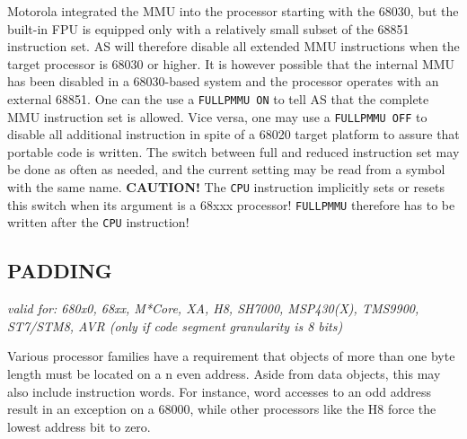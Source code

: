 \documentclass[12pt,twoside]{report}
\makeatletter
\newcommand{\bb}[1]{{\bf #1}}
\newcommand{\tty}[1]{{\tt #1}}
\newcommand{\ttindex}[1]{\index{#1@{\tt #1}}}
\makeatother
\begin{document}
Motorola integrated the MMU into the processor starting with the 68030, but
the built-in FPU is equipped only with a relatively small subset of the
68851 instruction set.  AS will therefore disable all extended MMU
instructions when the target processor is 68030 or higher.  It is however
possible that the internal MMU has been disabled in a 68030-based system
and the processor operates with an external 68851.  One can the use a
\tty{FULLPMMU ON} to tell AS that the complete MMU instruction set is
allowed.  Vice versa, one may use a \tty{FULLPMMU OFF} to disable all
additional instruction in spite of a 68020 target platform to assure that
portable code is written.  The switch between full and reduced instruction
set may be done as often as needed, and the current setting may be read
from a symbol with the same name.  \bb{CAUTION!} The \tty{CPU} instruction
implicitly sets or resets this switch when its argument is a 68xxx
processor!  \tty{FULLPMMU} therefore has to be written after the \tty{CPU}
instruction!


\subsection{PADDING}
\ttindex{PADDING}

{\em valid for: 680x0, 68xx, M*Core, XA, H8, SH7000, MSP430(X), TMS9900,\\
      ST7/STM8, AVR (only if code segment granularity is 8 bits)}

Various processor families have a requirement that objects of more than
one byte length must be located on a n even address.  Aside from data
objects, this may also include instruction words.  For instance, word
accesses to an odd address result in an exception on a 68000, while other
processors like the H8 force the lowest address bit to zero.
\end{document}
